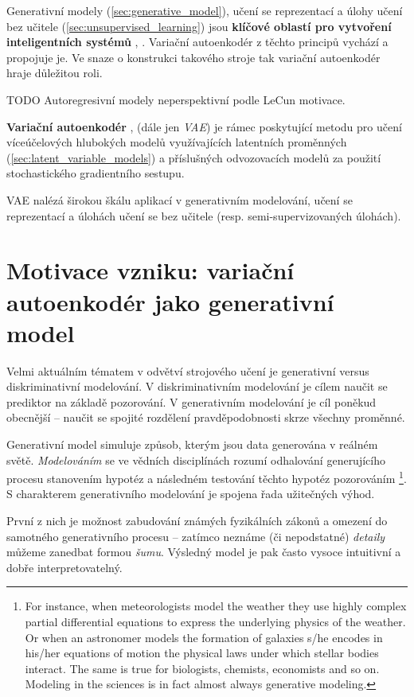 Generativní modely (\autoref{sec:generative_model}), učení se reprezentací \cite{Bengio2014} a úlohy učení bez učitele (\autoref{sec:unsupervised_learning}) jsou \textbf{klíčové oblastí pro vytvoření inteligentních systémů} \cite{Kingma2019}, \cite{LeCun2022}.
Variační autoenkodér z těchto principů vychází a propojuje je. Ve snaze o konstrukci takového stroje tak variační autoenkodér hraje důležitou roli.

TODO Autoregresivní modely neperspektivní podle LeCun motivace.

\textbf{Variační autoenkodér} \cite{Kingma2014}, \cite{Rezende2014} (dále jen \emph{VAE})
je rámec poskytující metodu pro učení víceúčelových hlubokých modelů využívajících latentních proměnných (\autoref{sec:latent_variable_models})
a příslušných odvozovacích modelů
za použití stochastického gradientního sestupu. \cite{Kingma2019}

VAE nalézá širokou škálu aplikací v generativním modelování, učení se reprezentací a úlohách učení se bez učitele (resp. semi-supervizovaných úlohách).

\section{Motivace vzniku: variační autoenkodér jako generativní model}
Velmi aktuálním tématem v odvětví strojového učení je generativní versus diskriminativní modelování.
V diskriminativním modelování je cílem naučit se prediktor na základě pozorování.
V generativním modelování je cíl poněkud obecnější – naučit se spojité rozdělení pravděpodobnosti skrze všechny proměnné.

Generativní model simuluje způsob, kterým jsou data generována v reálném světě.
\emph{Modelováním} se ve vědních disciplínách rozumí odhalování generujícího procesu stanovením hypotéz a následném testování těchto hypotéz pozorováním
\footnote{For instance, when meteorologists
model the weather they use highly complex partial differential equations
to express the underlying physics of the weather. Or when an astronomer
models the formation of galaxies s/he encodes in his/her equations of
motion the physical laws under which stellar bodies interact. The same
is true for biologists, chemists, economists and so on. Modeling in the
sciences is in fact almost always generative modeling.}. 
S charakterem generativního modelování je spojena řada užitečných výhod.

První z nich je možnost zabudování známých fyzikálních zákonů a omezení do samotného generativního procesu – 
zatímco neznáme (či nepodstatné) \emph{detaily} můžeme zanedbat formou \emph{šumu}. 
Výsledný model je pak často vysoce intuitivní a dobře interpretovatelný.

